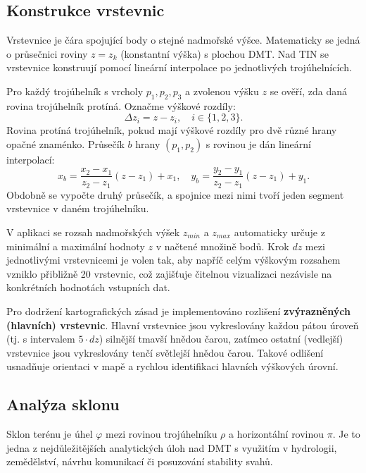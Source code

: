 \documentclass[11pt, a4paper]{article}
\begin{document}
\subsection{Konstrukce vrstevnic}
Vrstevnice je čára spojující body o stejné nadmořské výšce. Matematicky se jedná o průsečnici roviny $z = z_k$ (konstantní výška) s plochou DMT. Nad TIN se vrstevnice konstruují pomocí lineární interpolace po jednotlivých trojúhelnících.

Pro každý trojúhelník s vrcholy $p_1, p_2, p_3$ a zvolenou výšku $z$ se ověří, zda daná rovina trojúhelník protíná. Označme výškové rozdíly:
\begin{equation}
\Delta z_i = z - z_i, \quad i \in \{1, 2, 3\}.
\end{equation}
Rovina protíná trojúhelník, pokud mají výškové rozdíly pro dvě různé hrany opačné znaménko. Průsečík $b$ hrany $(p_1, p_2)$ s rovinou je dán lineární interpolací:
\begin{equation}
x_b = \frac{x_2 - x_1}{z_2 - z_1}(z - z_1) + x_1, \quad y_b = \frac{y_2 - y_1}{z_2 - z_1}(z - z_1) + y_1.
\end{equation}
Obdobně se vypočte druhý průsečík, a spojnice mezi nimi tvoří jeden segment vrstevnice v daném trojúhelníku.

V aplikaci se rozsah nadmořských výšek $z_{min}$ a $z_{max}$ automaticky určuje z minimální a maximální hodnoty $z$ v načtené množině bodů. Krok $dz$ mezi jednotlivými vrstevnicemi je volen tak, aby napříč celým výškovým rozsahem vzniklo přibližně 20 vrstevnic, což zajišťuje čitelnou vizualizaci nezávisle na konkrétních hodnotách vstupních dat.

Pro dodržení kartografických zásad je implementováno rozlišení \textbf{zvýrazněných (hlavních) vrstevnic}. Hlavní vrstevnice jsou vykreslovány každou pátou úroveň (tj. s intervalem $5 \cdot dz$) silnější tmavší hnědou čarou, zatímco ostatní (vedlejší) vrstevnice jsou vykreslovány tenčí světlejší hnědou čarou. Takové odlišení usnadňuje orientaci v mapě a rychlou identifikaci hlavních výškových úrovní.

\subsection{Analýza sklonu}
Sklon terénu je úhel $\varphi$ mezi rovinou trojúhelníku $\rho$ a horizontální rovinou $\pi$. Je to jedna z nejdůležitějších analytických úloh nad DMT s využitím v hydrologii, zemědělství, návrhu komunikací či posuzování stability svahů.
\end{document}

